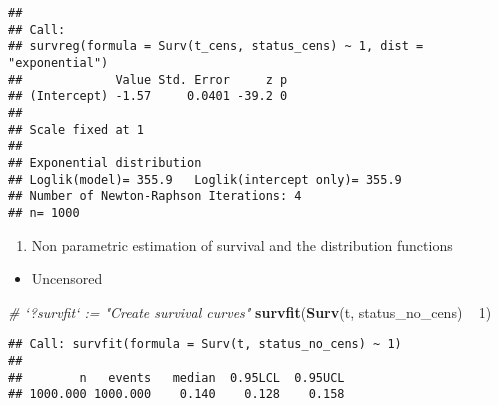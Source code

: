 \documentclass[]{book}
\newenvironment{Shaded}{\begin{snugshade}}{\end{snugshade}}
\newcommand{\KeywordTok}[1]{\textcolor[rgb]{0.13,0.29,0.53}{\textbf{{#1}}}}
\newcommand{\DecValTok}[1]{\textcolor[rgb]{0.00,0.00,0.81}{{#1}}}
\newcommand{\StringTok}[1]{\textcolor[rgb]{0.31,0.60,0.02}{{#1}}}
\newcommand{\CommentTok}[1]{\textcolor[rgb]{0.56,0.35,0.01}{\textit{{#1}}}}
\newcommand{\NormalTok}[1]{{#1}}
\providecommand{\tightlist}{%
  \setlength{\itemsep}{0pt}\setlength{\parskip}{0pt}}
\theoremstyle{definition}
\theoremstyle{definition}
\theoremstyle{definition}
\theoremstyle{remark}
\begin{document}
\begin{verbatim}
## 
## Call:
## survreg(formula = Surv(t_cens, status_cens) ~ 1, dist = "exponential")
##             Value Std. Error     z p
## (Intercept) -1.57     0.0401 -39.2 0
## 
## Scale fixed at 1 
## 
## Exponential distribution
## Loglik(model)= 355.9   Loglik(intercept only)= 355.9
## Number of Newton-Raphson Iterations: 4 
## n= 1000
\end{verbatim}

\begin{enumerate}
\def\labelenumi{\arabic{enumi}.}
\setcounter{enumi}{3}
\tightlist
\item
  Non parametric estimation of survival and the distribution functions
\end{enumerate}

\begin{itemize}
\tightlist
\item
  Uncensored
\end{itemize}

\begin{Shaded}
\begin{Highlighting}[]
\CommentTok{# `?survfit` := "Create survival curves"}
\KeywordTok{survfit}\NormalTok{(}\KeywordTok{Surv}\NormalTok{(t, status_no_cens) ~}\StringTok{ }\DecValTok{1}\NormalTok{)}
\end{Highlighting}
\end{Shaded}

\begin{verbatim}
## Call: survfit(formula = Surv(t, status_no_cens) ~ 1)
## 
##        n   events   median  0.95LCL  0.95UCL 
## 1000.000 1000.000    0.140    0.128    0.158
\end{verbatim}
\end{document}

